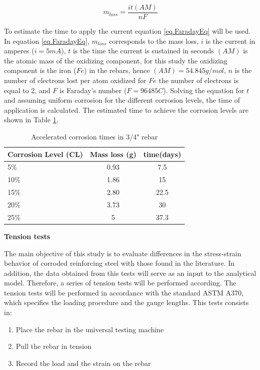 \begin{equation}
	m_{loss}=\frac{it(AM)}{nF}
	\label{eq.FaradayEq}
\end{equation}

To estimate the time to apply the current equation \ref{eq.FaradayEq} will be used. In equation \ref{eq.FaradayEq}, $m_{loss}$ corresponds to the mass loss, $i$ is the current in amperes ($i=5 mA$), $t$ is the time the current is sustained in seconds $(AM)$ is the atomic mass of the oxidizing component, for this study the oxidizing component is the iron ($Fe$) in the rebars, hence $(AM)=54.845g/mol$, $n$ is the number of electrons lost per atom oxidized for $Fe$ the number of electrons is equal to 2, and $F$ is Faraday's number ($F=96485 C$). Solving the equation for $t$ and assuming uniform corrosion for the different corrosion levels, the time of application is calculated. The estimated time to achieve the corrosion levels are shown in Table \ref{tab:AcceleratedCorrosionTime}. 

\begin{table}[htbp]
	\caption{Accelerated corrosion times in 3/4" rebar}
	\label{tab:AcceleratedCorrosionTime}
	\centering	
		\begin{tabular}{|l|c|c|}
		\hline
		Corrosion Level (CL) & Mass loss (g)   & time(days)     \\  \hline	
		5\%                  & 0.93            & 7.5    \\  \hline	
		10\%                 & 1.86            & 15     \\  \hline	
		15\%                 & 2.80            & 22.5   \\  \hline	
		20\%                 & 3.73            & 30     \\  \hline	
		25\%                 & 5               & 37.3   \\  \hline	
		\end{tabular}
\end{table}
\newpage

\textbf{Tension tests}

The main objective of this study is to evaluate differences in the stress-strain behavior of corroded reinforcing steel with those found in the literature. In addition, the data obtained from this tests will serve as an input to the analytical model. Therefore, a series of tension tests will be performed according. The tension tests will be performed in accordance with the standard ASTM A370, which specifies the loading procedure and the gauge lengths. This tests consists in:
\begin{enumerate}
    \item Place the rebar in the universal testing machine
    \item Pull the rebar in tension 
    \item Record the load and the strain on the rebar 
\end{enumerate}


